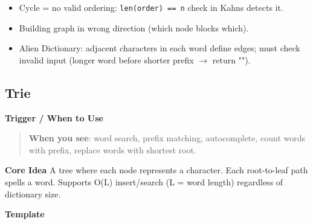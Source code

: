 \documentclass[11pt]{article}
\providecommand{\tightlist}{\setlength{\itemsep}{1pt}\setlength{\parskip}{0pt}}
\begin{document}
\begin{itemize}
\tightlist
\item
  Cycle = no valid ordering: \texttt{len(order)\ ==\ n} check in Kahn\textquotesingle s detects it.
\item
  Building graph in wrong direction (which node blocks which).
\item
  Alien Dictionary: adjacent characters in each word define edges; must check invalid input (longer word before shorter prefix \(\rightarrow\) return "").
\end{itemize}

\subsection{Trie}\label{trie}

\textbf{Trigger / When to Use}

\begin{quote}
\textbf{When you see}: word search, prefix matching, autocomplete, count words with prefix, replace words with shortest root.
\end{quote}

\textbf{Core Idea}
A tree where each node represents a character. Each root-to-leaf path spells a word. Supports O(L) insert/search (L = word length) regardless of dictionary size.

\textbf{Template}

\end{document}
